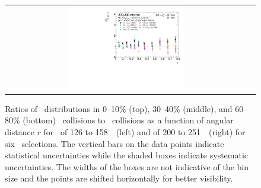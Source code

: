 \begin{figure}[h]
{\begin{tabular}{cc}
            \includegraphics[width=0.5\textwidth]{figures/results/RDpT_dR_jet9_cent5.pdf} \\
      \end{tabular}
      }
\caption{Ratios of \Dptr\ distributions in 0--10\% (top), 30--40\% (middle), and 60--80\% (bottom) \PbPb\ collisions to \pp\ collisions as a function of angular distance $r$ for \ptjet\ of 126 to 158~\GeV\ (left) and of 200 to 251~\GeV\ (right) for six \pt\ selections. The vertical bars on the data points indicate statistical uncertainties while the shaded boxes indicate systematic uncertainties. The widths of the boxes are not indicative of the bin size and the points are shifted horizontally for better visibility.}
\label{fig:rdptr}
\end{figure}




